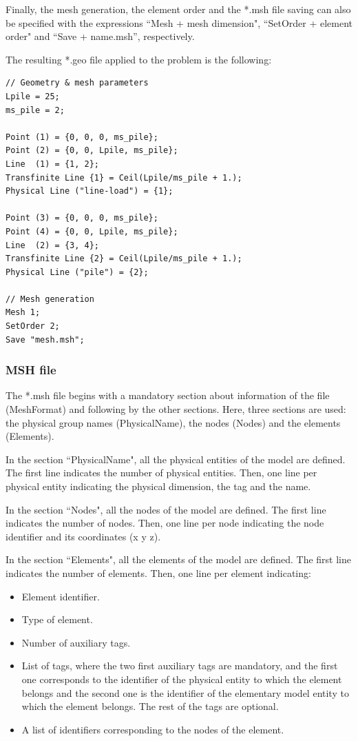 \documentclass[a4]{article}
\begin{document}
Finally, the mesh generation, the element order and the *.msh file saving can also be specified with the expressions ``Mesh + mesh dimension", ``SetOrder + element order" and ``Save + name.msh”,
respectively.

The resulting *.geo file applied to the problem is the following:

\begin{Verbatim}
// Geometry & mesh parameters
Lpile = 25;
ms_pile = 2;

Point (1) = {0, 0, 0, ms_pile};
Point (2) = {0, 0, Lpile, ms_pile};
Line  (1) = {1, 2};
Transfinite Line {1} = Ceil(Lpile/ms_pile + 1.);
Physical Line ("line-load") = {1};

Point (3) = {0, 0, 0, ms_pile};
Point (4) = {0, 0, Lpile, ms_pile};
Line  (2) = {3, 4};
Transfinite Line {2} = Ceil(Lpile/ms_pile + 1.);
Physical Line ("pile") = {2};

// Mesh generation
Mesh 1;
SetOrder 2;
Save "mesh.msh";
\end{Verbatim}

\subsubsection{MSH file}

The *.msh file begins with a mandatory section about information of the file (MeshFormat) and following by the other sections. Here, three sections are used: the physical group names (PhysicalName), the nodes (Nodes) and the elements (Elements).

In the section ``PhysicalName", all the physical entities of the model are defined. The first line indicates the number of physical entities. Then, one line per physical entity indicating the physical dimension, the tag and the name.  

In the section ``Nodes", all the nodes of the model are defined. The first line indicates the number of nodes. Then, one line per node indicating the node identifier and its coordinates (x y z).

In the section ``Elements", all the elements of the model are defined. The first line indicates the number of elements. Then, one line per element indicating:

\begin{itemize}
	\item Element identifier.
	\item Type of element.
	\item Number of auxiliary tags.
	\item List of tags, where the two first auxiliary tags are mandatory, and the first one corresponds to the identifier of the physical entity to which the element belongs and the second one is the identifier of the elementary model entity to which the element belongs. The rest of the tags are optional.
	\item A list of identifiers corresponding to the nodes of the element.
\end{itemize}
\end{document}
